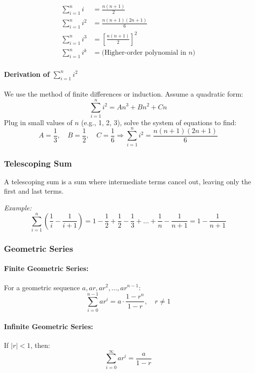 \begin{align*}
\sum_{i = 1}^{n} i &= \frac{n(n+1)}{2} \\
\sum_{i = 1}^{n} i^2 &= \frac{n(n+1)(2n+1)}{6} \\
\sum_{i = 1}^{n} i^3 &= \left[\frac{n(n+1)}{2}\right]^2 \\
\sum_{i = 1}^{n} i^k &= \text{(Higher-order polynomial in $n$)}
\end{align*}

\paragraph{Derivation of \texorpdfstring{$\sum_{i=1}^{n} i^2$}{∑i²}}

We use the method of finite differences or induction. Assume a quadratic form:
\[
\sum_{i=1}^{n} i^2 = An^3 + Bn^2 + Cn
\]
Plug in small values of $n$ (e.g., 1, 2, 3), solve the system of equations to find:
\[
A = \frac{1}{3}, \quad B = \frac{1}{2}, \quad C = \frac{1}{6}
\Rightarrow \sum_{i = 1}^{n} i^2 = \frac{n(n+1)(2n+1)}{6}
\]

\subsubsection*{Telescoping Sum}

A telescoping sum is a sum where intermediate terms cancel out, leaving only the first and last terms.

\textit{Example:}
\[
\sum_{i=1}^{n} \left( \frac{1}{i} - \frac{1}{i+1} \right)
= 1 - \frac{1}{2} + \frac{1}{2} - \frac{1}{3} + \dots + \frac{1}{n} - \frac{1}{n+1}
= 1 - \frac{1}{n+1}
\]

\subsubsection*{Geometric Series}

\paragraph{Finite Geometric Series:}
For a geometric sequence $a, ar, ar^2, \dots, ar^{n-1}$:
\[
\sum_{i = 0}^{n - 1} ar^i = a \cdot \frac{1 - r^n}{1 - r}, \quad r \ne 1
\]

\paragraph{Infinite Geometric Series:}
If $|r| < 1$, then:
\[
\sum_{i = 0}^{\infty} ar^i = \frac{a}{1 - r}
\]


